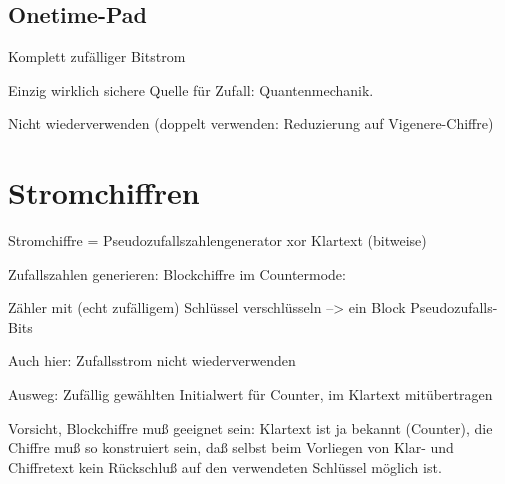 \section{Onetime-Pad}

Komplett zufälliger Bitstrom

Einzig wirklich sichere Quelle für Zufall: Quantenmechanik.

Nicht wiederverwenden (doppelt verwenden: Reduzierung auf Vigenere-Chiffre)


\chapter{Stromchiffren}

Stromchiffre = Pseudozufallszahlengenerator xor Klartext (bitweise)

Zufallszahlen generieren: Blockchiffre im Countermode:

Zähler mit (echt zufälligem) Schlüssel verschlüsseln --> ein Block Pseudozufalls-Bits

Auch hier: Zufallsstrom nicht wiederverwenden

Ausweg: Zufällig gewählten Initialwert für Counter, im Klartext mitübertragen

Vorsicht, Blockchiffre muß geeignet sein: Klartext ist ja bekannt (Counter), die Chiffre muß so konstruiert sein, daß selbst beim Vorliegen von Klar- und Chiffretext kein Rückschluß auf den verwendeten Schlüssel möglich ist.
